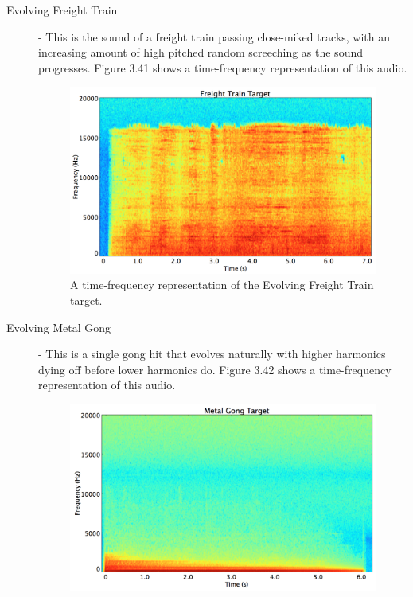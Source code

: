 \documentclass[a4paper,12pt]{report} 	%
\numberwithin{figure}{chapter}
\numberwithin{table}{chapter}
\numberwithin{equation}{chapter}
\begin{document}
\begin{flushleft}
\begin{description}
\begin{figure}[h!]
\end{figure}
\item[Evolving Freight Train] - This is the sound of a freight train passing close-miked tracks, with an increasing amount of high pitched random screeching as the sound progresses. Figure 3.41 shows a time-frequency representation of this audio.
\begin{figure}[h!]
\begin{center}
\includegraphics[scale=0.35,width=\linewidth]{FreightTrainTargetSTFT}
\caption[Evolving Freight Train Time-Frequency Representation]{A time-frequency representation of the Evolving Freight Train target.}
\end{center}
\end{figure}
\item[Evolving Metal Gong] - This is a single gong hit that evolves naturally with higher harmonics dying off before lower harmonics do. Figure 3.42 shows a time-frequency representation of this audio.
\begin{figure}[h!]
\begin{center}
\includegraphics[scale=0.35,width=\linewidth]{MetalGongTargetSTFT}

\end{center}
\end{figure}
\end{description}
\end{flushleft}
\end{document}
